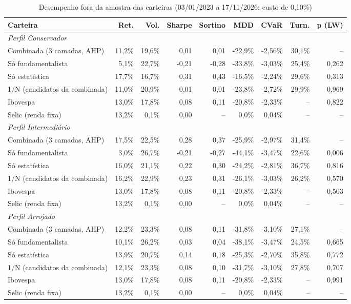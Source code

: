 \begin{table}[htbp]
\centering
\caption{Desempenho fora da amostra das carteiras (03/01/2023 a 17/11/2026; custo de 0,10\%)}
\label{tab:resultado-backtest}
\footnotesize
\begin{tabular}{lrrrrrrrr}
\toprule
\textbf{Carteira} & \textbf{Ret.} & \textbf{Vol.} & \textbf{Sharpe} & \textbf{Sortino} & \textbf{MDD} & \textbf{CVaR} & \textbf{Turn.} & \textbf{p (LW)} \\
\midrule
\multicolumn{9}{l}{\textit{Perfil Conservador}} \\
Combinada (3 camadas, AHP) & 11,2\% & 19,6\% & 0,01 & 0,01 & -22,9\% & -2,56\% & 30,1\% & -- \\
Só fundamentalista & 5,1\% & 22,7\% & -0,21 & -0,28 & -33,8\% & -3,03\% & 25,4\% & 0,262 \\
Só estatística & 17,7\% & 16,7\% & 0,31 & 0,43 & -16,5\% & -2,24\% & 29,6\% & 0,313 \\
1/N (candidatos da combinada) & 11,0\% & 20,9\% & 0,01 & 0,01 & -23,8\% & -2,72\% & 29,9\% & 0,969 \\
Ibovespa & 13,0\% & 17,8\% & 0,08 & 0,11 & -20,8\% & -2,33\% & -- & 0,822 \\
Selic (renda fixa) & 13,2\% & 0,1\% & 0,00 & -- & 0,0\% & 0,04\% & -- & -- \\
\midrule
\multicolumn{9}{l}{\textit{Perfil Intermediário}} \\
Combinada (3 camadas, AHP) & 17,5\% & 22,5\% & 0,28 & 0,37 & -25,9\% & -2,97\% & 31,4\% & -- \\
Só fundamentalista & 3,0\% & 26,7\% & -0,21 & -0,27 & -44,1\% & -3,47\% & 22,6\% & 0,006 \\
Só estatística & 16,0\% & 21,1\% & 0,22 & 0,30 & -24,2\% & -2,81\% & 36,7\% & 0,816 \\
1/N (candidatos da combinada) & 16,2\% & 22,9\% & 0,23 & 0,31 & -26,1\% & -3,03\% & 26,2\% & 0,570 \\
Ibovespa & 13,0\% & 17,8\% & 0,08 & 0,11 & -20,8\% & -2,33\% & -- & 0,503 \\
Selic (renda fixa) & 13,2\% & 0,1\% & 0,00 & -- & 0,0\% & 0,04\% & -- & -- \\
\midrule
\multicolumn{9}{l}{\textit{Perfil Arrojado}} \\
Combinada (3 camadas, AHP) & 12,2\% & 23,3\% & 0,08 & 0,11 & -31,8\% & -3,10\% & 27,1\% & -- \\
Só fundamentalista & 10,1\% & 26,2\% & 0,03 & 0,04 & -38,1\% & -3,47\% & 24,5\% & 0,665 \\
Só estatística & 13,9\% & 20,7\% & 0,14 & 0,18 & -25,3\% & -2,70\% & 35,8\% & 0,772 \\
1/N (candidatos da combinada) & 12,1\% & 23,3\% & 0,08 & 0,10 & -31,7\% & -3,10\% & 27,8\% & 0,707 \\
Ibovespa & 13,0\% & 17,8\% & 0,08 & 0,11 & -20,8\% & -2,33\% & -- & 0,991 \\
Selic (renda fixa) & 13,2\% & 0,1\% & 0,00 & -- & 0,0\% & 0,04\% & -- & -- \\
\bottomrule
\end{tabular}


\end{table}
